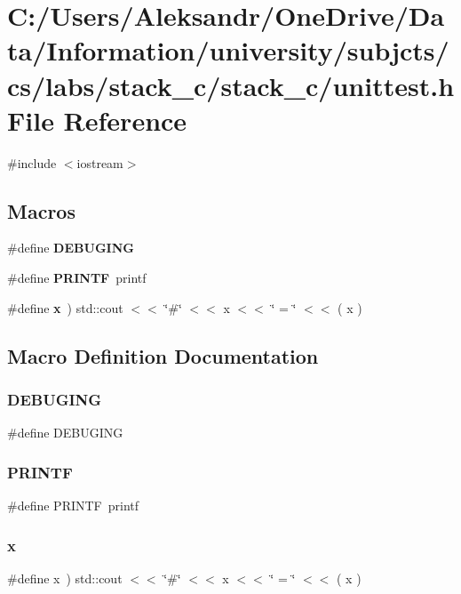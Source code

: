 \section{C\+:/\+Users/\+Aleksandr/\+One\+Drive/\+Data/\+Information/university/subjcts/cs/labs/stack\+\_\+c/stack\+\_\+c/unittest.h File Reference}
\label{unittest_8h}
{\ttfamily \#include $<$iostream$>$}\newline
\subsection*{Macros}
\begin{DoxyCompactItemize}
\item 
\#define \textbf{ D\+E\+B\+U\+G\+I\+NG}
\item 
\#define \textbf{ P\+R\+I\+N\+TF}~printf
\item 
\#define \textbf{ x}~) std\+::cout $<$$<$ \char`\"{}\#\char`\"{} $<$$<$ x $<$$<$ \char`\"{} = \char`\"{} $<$$<$ ( x )
\end{DoxyCompactItemize}


\subsection{Macro Definition Documentation}
\mbox{\label{unittest_8h_aeff79046387df0de04e7de11061a704b}} 
\subsubsection{D\+E\+B\+U\+G\+I\+NG}
{\footnotesize\ttfamily \#define D\+E\+B\+U\+G\+I\+NG}

\mbox{\label{unittest_8h_ae1649fc947ca37a86917a08354f48d1a}} 
\subsubsection{P\+R\+I\+N\+TF}
{\footnotesize\ttfamily \#define P\+R\+I\+N\+TF~printf}

\mbox{\label{unittest_8h_a6c4b361d72eb3767ba424ac9a6ecf52b}} 
\subsubsection{x}
{\footnotesize\ttfamily \#define x~) std\+::cout $<$$<$ \char`\"{}\#\char`\"{} $<$$<$ x $<$$<$ \char`\"{} = \char`\"{} $<$$<$ ( x )}

